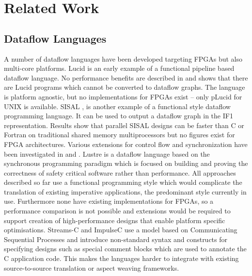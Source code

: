 \section{Related Work}

\subsection{Dataflow Languages}

A number of dataflow languages have been developed targeting FPGAs but
also multi-core platforms. Lucid \cite{ashcroft1977lucid} is an early
example of a functional pipeline based dataflow language. No
performance benefits are described in \cite{ashcroft1977lucid} and
\cite{ashcroft1980some} shows that there are Lucid programs which
cannot be converted to dataflow graphs. The language is platform
agnostic, but no implementations for FPGAs exist -- only pLucid
\cite{pLucid} for UNIX is available. SISAL \cite{gurd1987implicit},
\cite{mcgraw1983sisal} is another example of a functional style
dataflow programming language. It can be used to output a dataflow
graph in the IF1 representation. Results show that parallel SISAL
designs can be faster \cite{archambault2010fine} than C or Fortran on
traditional shared memory multiprocessors but no figures exist for
FPGA architectures. Various extensions for control flow and
synchronization have been investigated in \cite{143862} and
\cite{183202}. Lustre \cite{halbwachs1991synchronous} is a dataflow
language based on the synchronous programming paradigm which is
focused on building and proving the correctness of safety critical
software \cite{halbwachs1992programming} rather than performance.  All
approaches described so far use a functional programming style which
would complicate the translation of existing imperative applications,
the predominant style currently in use. Furthermore none have existing
implementations for FPGAs, so a performance comparison is not possible
and extensions would be required to support creation of
high-performance designs that enable platform specific optimisations.
Streams-C\cite{Gokhale:Stone:Arnold:Kalinowski:2000} and
ImpulseC\cite{ImpulseC} use a model based on Communicating Sequential
Processes and introduce non-standard syntax and constructs for
specifying designs such as special comment blocks which are used to
annotate the C application code. This makes the languages harder to
integrate with existing source-to-source translation or aspect weaving
frameworks.

